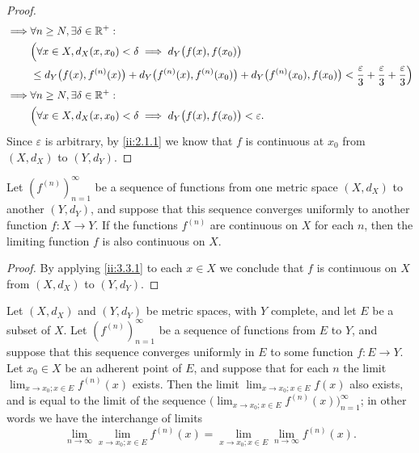 \begin{proof}
\begin{align*}
    \implies & \forall n \geq N, \exists \delta \in \mathbb{R}^+ :                                                                                                                                                    \\
             & \Big(\forall x \in X, d_X(x, x_0) < \delta \implies d_Y\big(f(x), f(x_0)\big)                                                                                                                  \\
             & \leq d_Y\big(f(x), f^{(n)}(x)\big) + d_Y\big(f^{(n)}(x), f^{(n)}(x_0)\big) + d_Y\big(f^{(n)}(x_0), f(x_0)\big) < \dfrac{\varepsilon}{3} + \dfrac{\varepsilon}{3} + \dfrac{\varepsilon}{3}\Big) \\
    \implies & \forall n \geq N, \exists \delta \in \mathbb{R}^+ :                                                                                                                                                    \\
             & \Big(\forall x \in X, d_X(x, x_0) < \delta \implies d_Y\big(f(x), f(x_0)\big) < \varepsilon.
  \end{align*}
  Since \(\varepsilon\) is arbitrary, by \cref{ii:2.1.1} we know that \(f\) is continuous at \(x_0\) from \((X, d_X)\) to \((Y, d_Y)\).
\end{proof}

\begin{cor}\label{ii:3.3.2}
  Let \((f^{(n)})_{n = 1}^\infty\) be a sequence of functions from one metric space \((X, d_X)\) to another \((Y, d_Y)\), and suppose that this sequence converges uniformly to another function \(f : X \to Y\).
  If the functions \(f^{(n)}\) are continuous on \(X\) for each \(n\), then the limiting function \(f\) is also continuous on \(X\).
\end{cor}

\begin{proof}
  By applying \cref{ii:3.3.1} to each \(x \in X\) we conclude that \(f\) is continuous on \(X\) from \((X, d_X)\) to \((Y, d_Y)\).
\end{proof}

\begin{prop}\label{ii:3.3.3}
  Let
  \((X, d_X)\) and \((Y, d_Y)\) be metric spaces, with \(Y\) complete, and let \(E\) be a subset of \(X\).
  Let \((f^{(n)})_{n = 1}^\infty\) be a sequence of functions from \(E\) to \(Y\), and suppose that this sequence converges uniformly in \(E\) to some function \(f : E \to Y\).
  Let \(x_0 \in X\) be an adherent point of \(E\), and suppose that for each \(n\) the limit \(\lim_{x \to x_0 ; x \in E} f^{(n)}(x)\) exists.
  Then the limit \(\lim_{x \to x_0 ; x \in E} f(x)\) also exists, and is equal to the limit of the sequence \(\big(\lim_{x \to x_0 ; x \in E} f^{(n)}(x)\big)_{n = 1}^\infty\);
  in other words we have the interchange of limits
  \[
    \lim_{n \to \infty} \lim_{x \to x_0 ; x \in E} f^{(n)}(x) = \lim_{x \to x_0 ; x \in E} \lim_{n \to \infty} f^{(n)}(x).
  \]
\end{prop}

